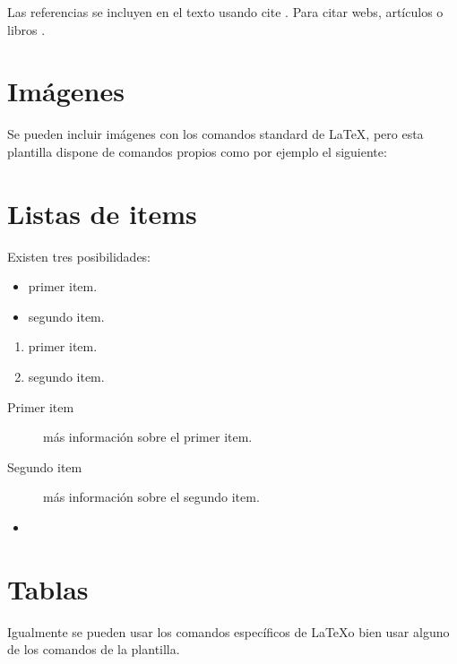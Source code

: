 Las referencias se incluyen en el texto usando cite \cite{wiki:latex}. Para citar webs, artículos o libros \cite{koza92}.


\section{Imágenes}

Se pueden incluir imágenes con los comandos standard de \LaTeX, pero esta plantilla dispone de comandos propios como por ejemplo el siguiente:




\section{Listas de items}

Existen tres posibilidades:

\begin{itemize}
	\item primer item.
	\item segundo item.
\end{itemize}

\begin{enumerate}
	\item primer item.
	\item segundo item.
\end{enumerate}

\begin{description}
	\item[Primer item] más información sobre el primer item.
	\item[Segundo item] más información sobre el segundo item.
\end{description}

\begin{itemize}
\item
\end{itemize}

\section{Tablas}

Igualmente se pueden usar los comandos específicos de \LaTeX o bien usar alguno de los comandos de la plantilla.

